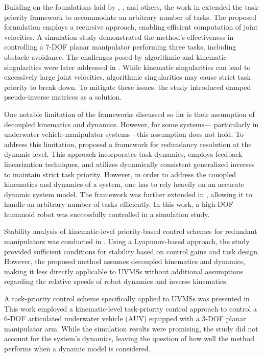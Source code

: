 Building on the foundations laid by \cite{hanafusa1981}, \cite{nakamura1987}, 
and others, the work in \cite{siciliano1991} extended the task-priority 
framework to accommodate an arbitrary number of tasks. The proposed formulation 
employs a recursive approach, enabling efficient computation of joint 
velocities. A simulation study demonstrated the method's effectiveness in 
controlling a 7-DOF planar manipulator performing three tasks, including 
obstacle avoidance. The challenges posed by algorithmic and kinematic 
singularities were later addressed in \cite{chiaverini1997}. While kinematic 
singularities can lead to excessively large joint velocities, algorithmic 
singularities may cause strict task priority to break down. To mitigate these 
issues, the study introduced damped pseudo-inverse matrices as a solution.

One notable limitation of the frameworks discussed so far is their assumption 
of decoupled kinematics and dynamics. However, for some systems—
particularly in underwater vehicle-manipulator systems—this 
assumption does not hold. To address this limitation, \cite{khatib1987} 
proposed a framework for redundancy resolution at the dynamic level. This 
approach incorporates task dynamics, employs feedback linearization techniques, 
and utilizes dynamically consistent generalized inverses \cite{khatib1995} to 
maintain strict task priority.
However, in order to address the couopled kinematics and dynamics of a system, one has to rely heavily on an accurate
dynamic system model.
The framework was further extended in \cite{khatib2004,sentis2004}, 
allowing it to handle an arbitrary number of tasks efficiently. In this work, a 
high-DOF humanoid robot was successfully controlled in a simulation study.

Stability analysis of kinematic-level priority-based control schemes for 
redundant manipulators was conducted in \cite{antonelli2009}. Using a 
Lyapunov-based approach, the study provided sufficient conditions for stability 
based on control gains and task design. However, the proposed method assumes 
decoupled kinematics and dynamics, making it less directly applicable to UVMSs 
without additional assumptions regarding the relative speeds of robot dynamics 
and inverse kinematics.

A task-priority control scheme specifically applied to UVMSs was presented in 
\cite{antonelli1998}. This work employed a kinematic-level task-priority 
control approach to control a 6-DOF articulated underwater vehicle (AUV) 
equipped with a 3-DOF planar manipulator arm. While the simulation results were 
promising, the study did not account for the system's dynamics, leaving the question
of how well the method performs when a dynamic model is considered.

